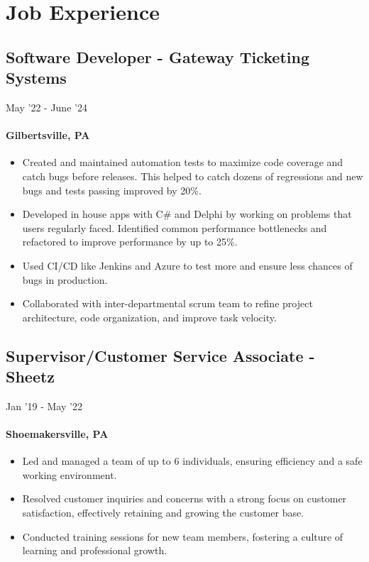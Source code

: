 \documentclass{article}
\begin{document}
\section{Job Experience}
\subsection{Software Developer - Gateway Ticketing Systems} \hfill May '22 - June '24
\paragraph{Gilbertsville, PA}

\begin{itemize}
  \itemsep0em 
  \item Created and maintained automation tests to maximize code coverage and catch bugs before releases. This helped to catch dozens of regressions and new bugs and tests passing improved by 20\%. 
  \item Developed in house apps with C\# and Delphi by working on problems that users regularly faced. Identified common performance bottlenecks and 
  refactored to improve performance by up to 25\%.
  \item Used CI/CD like Jenkins and Azure to test more and ensure less chances of bugs in production.
  \item Collaborated with inter-departmental scrum team to refine project architecture, code organization, and improve task velocity.
\end{itemize}

\subsection{Supervisor/Customer Service Associate - Sheetz} \hfill Jan '19 - May '22
\paragraph{Shoemakersville, PA}
\begin{itemize}
  \itemsep0em 
  \item Led and managed a team of up to 6 individuals, ensuring efficiency and a safe working environment.
  \item Resolved customer inquiries and concerns with a strong focus on customer satisfaction, effectively retaining and growing the customer base.
  \item Conducted training sessions for new team members, fostering a culture of learning and professional growth.
\end{itemize}
\end{document}
